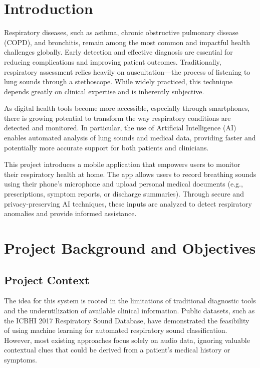 \section*{Introduction}

Respiratory diseases, such as asthma, chronic obstructive pulmonary disease (COPD), and bronchitis, remain among the most common and impactful health challenges globally. Early detection and effective diagnosis are essential for reducing complications and improving patient outcomes. Traditionally, respiratory assessment relies heavily on auscultation—the process of listening to lung sounds through a stethoscope. While widely practiced, this technique depends greatly on clinical expertise and is inherently subjective.

As digital health tools become more accessible, especially through smartphones, there is growing potential to transform the way respiratory conditions are detected and monitored. In particular, the use of Artificial Intelligence (AI) enables automated analysis of lung sounds and medical data, providing faster and potentially more accurate support for both patients and clinicians.

This project introduces a mobile application that empowers users to monitor their respiratory health at home. The app allows users to record breathing sounds using their phone’s microphone and upload personal medical documents (e.g., prescriptions, symptom reports, or discharge summaries). Through secure and privacy-preserving AI techniques, these inputs are analyzed to detect respiratory anomalies and provide informed assistance.

\section{Project Background and Objectives}

\subsection{Project Context}

The idea for this system is rooted in the limitations of traditional diagnostic tools and the underutilization of available clinical information. Public datasets, such as the ICBHI 2017 Respiratory Sound Database, have demonstrated the feasibility of using machine learning for automated respiratory sound classification. However, most existing approaches focus solely on audio data, ignoring valuable contextual clues that could be derived from a patient's medical history or symptoms.

